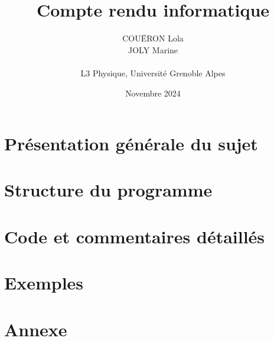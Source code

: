 \documentclass[a4paper, 12pt]{report}
\begin{document}
 
\title{\textbf{Compte rendu informatique}}
\author{COUËRON Lola \\ JOLY Marine \\ \\ L3 Physique, Université Grenoble Alpes}
\date{Novembre 2024}

\maketitle %

{
\hypersetup{hidelinks}

\renewcommand{\contentsname}{Sommaire}
\tableofcontents
}


\chapter{Présentation générale du sujet}

\chapter{Structure du programme}

\chapter{Code et commentaires détaillés}

\chapter{Exemples}

\chapter{Annexe}
\end{document}
